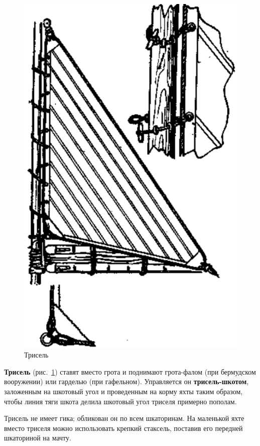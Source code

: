 \documentclass[a4paper, 12pt, twoside, final]{scrbook}
\begin{document}
\begin{figure}[htbp]
   \centering
   \includegraphics{pics/49_Trisel} %
   \caption{Трисель}
   \label{fig:49}
\end{figure}

\textbf{Трисель} (рис.~\ref{fig:49}) ставят вместо грота и поднимают грота-фалом (при бермудском вооружении) или гарделью (при гафельном). Управляется он \textbf{трисель-шкотом}, заложенным на шкотовый угол и проведенным на корму яхты таким образом, чтобы линия тяги шкота делила шкотовый угол триселя примерно пополам.

Трисель не имеет гика; обликован он по всем шкаторинам. На маленькой яхте вместо триселя можно использовать крепкий стаксель, поставив его передней шкаториной на мачту.
\end{document}
